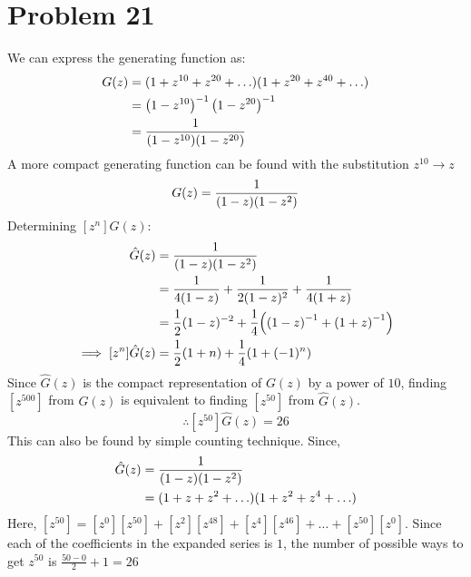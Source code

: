 \section*{Problem 21}
We can express the generating function as:
\begin{align*}
    G(z) & = (1 + z^{10} + z^{20} + \ldots )(1 + z^{20} + z^{40} + \ldots ) \\
         & =\left(1-z^{10}\right)^{-1}\left(1-z^{20}\right)^{-1}            \\
         & =\frac{1}{\brf*{1-z^{10}}\brf*{1-z^{20}}}
\end{align*}
A more compact generating function can be found with the substitution $z^{10} \rightarrow z$
\begin{align}
    G(z) = \frac{1}{\brf*{1-z}\brf*{1-z^2}} \label{ch7:21_1}
\end{align}
Determining $[z^n]G(z)$:
\begin{align*}
    \hat{G}(z)               & = \frac{1}{\brf*{1-z}\brf*{1-z^2}}                                           \\
                             & =\frac{1}{4(1-z)} + \frac{1}{2(1-z)^2} + \frac{1}{4(1+z)}                    \\
                             & =\frac{1}{2}(1-z)^{-2} + \frac{1}{4}\brf*{\brf*{1-z}^{-1} + \brf*{1+z}^{-1}} \\
    \implies [z^n]\hat{G}(z) & = \frac{1}{2}\brf*{1+n} + \frac{1}{4}\brf*{1+(-1)^n}
\end{align*}
Since $\hat{G}(z)$ is the compact representation of $G(z)$ by a power of $10$, finding $[z^{500}]$ from $G(z)$ is equivalent to finding $[z^{50}]$ from $\hat{G}(z)$.
\[
    \therefore [z^{50}]\hat{G}(z) = 26
\]
This can also be found by simple counting technique. Since,
\begin{align*}
    \hat{G}(z) & = \frac{1}{\brf*{1-z}\brf*{1-z^2}}  \\
               & =(1+z+z^2+\ldots)(1+z^2+z^4+\ldots)
\end{align*}
Here, $[z^{50}] =[z^0][z^{50}] + [z^2][z^{48}] + [z^4][z^{46}] + \ldots + [z^{50}][z^{0}]$. Since each of the coefficients in the expanded series is $1$, the number of possible ways to get $z^{50}$ is $\frac{50-0}{2} + 1 = 26$
\clearpage
